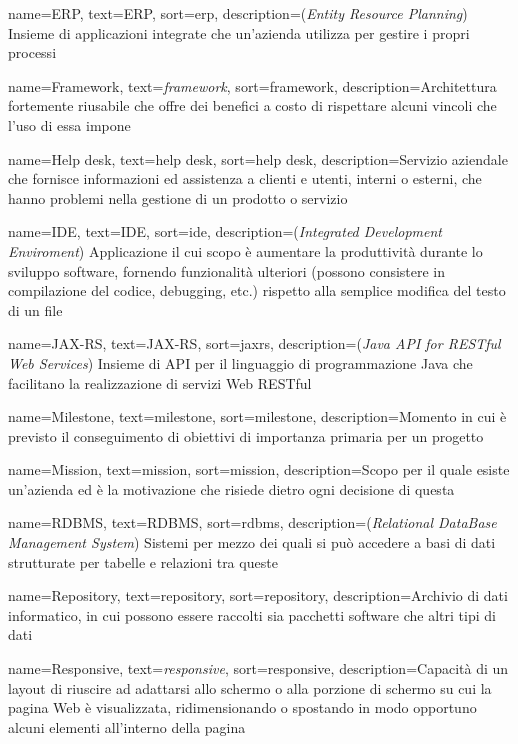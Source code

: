 {
    name={ERP},
    text=ERP,
    sort=erp,
    description={(\emph{Entity Resource Planning}) Insieme di applicazioni integrate che un'azienda utilizza per gestire i propri processi}
}

{
    name={Framework},
    text=\emph{framework},
    sort=framework,
    description={Architettura fortemente riusabile che offre dei benefici a costo di rispettare alcuni vincoli che l'uso di essa impone}
}

{
    name={Help desk},
    text=help desk,
    sort=help desk,
    description={Servizio aziendale che fornisce informazioni ed assistenza a clienti e utenti, interni o esterni, che hanno problemi nella gestione di un prodotto o servizio}
}

{
    name={IDE},
    text=IDE,
    sort=ide,
    description={(\emph{Integrated Development Enviroment}) Applicazione il cui scopo è aumentare la produttività durante lo sviluppo software, fornendo funzionalità ulteriori (possono consistere in compilazione del codice, debugging, etc.) rispetto alla semplice modifica del testo di un file}
}

{
    name={JAX-RS},
    text=JAX-RS,
    sort=jaxrs,
    description={(\emph{Java API for RESTful Web Services}) Insieme di API per il linguaggio di programmazione Java che facilitano la realizzazione di servizi Web RESTful}
}

{
    name={Milestone},
    text=milestone,
    sort=milestone,
    description={Momento in cui è previsto il conseguimento di obiettivi di importanza primaria per un progetto}
}

{
    name={Mission},
    text=mission,
    sort=mission,
    description={Scopo per il quale esiste un'azienda ed è la motivazione che risiede dietro ogni decisione di questa}
}

{
    name={RDBMS},
    text=RDBMS,
    sort=rdbms,
    description={(\emph{Relational DataBase Management System}) Sistemi per mezzo dei quali si può accedere a basi di dati strutturate per tabelle e relazioni tra queste}
}

{
    name={Repository},
    text=repository,
    sort=repository,
    description={Archivio di dati informatico, in cui possono essere raccolti sia pacchetti software che altri tipi di dati}
}

{
    name={Responsive},
    text=\emph{responsive},
    sort=responsive,
    description={Capacità di un layout di riuscire ad adattarsi allo schermo o alla porzione di schermo su cui la pagina Web è visualizzata, ridimensionando o spostando in modo opportuno alcuni elementi all'interno della pagina}
}

